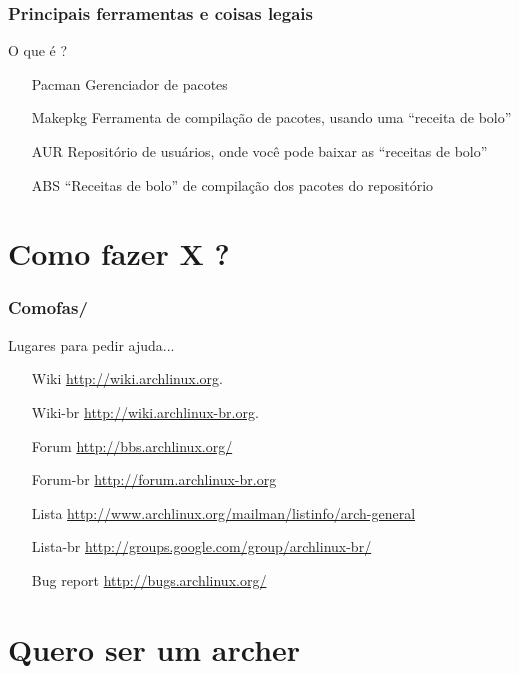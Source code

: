 \documentclass{beamer}
\begin{document}
\begin{frame}[fragile]
        \frametitle{Principais ferramentas e coisas legais}
        \begin{block}{O que é ?}
            \begin{itemize}
                \centering
                \item[Pacman] Gerenciador de pacotes
                \item[Makepkg] Ferramenta de compilação de pacotes, usando uma ``receita de bolo''
                \item[AUR] Repositório de usuários, onde você pode baixar as ``receitas de bolo''
                \item[ABS] ``Receitas de bolo'' de compilação dos pacotes do repositório
            \end{itemize}
        \end{block}
\end{frame}

\section{Como fazer X ? }

\begin{frame}
    \frametitle{Comofas/}
    \begin{block}{Lugares para pedir ajuda...}
        \begin{itemize}
            \centering
            \item[Wiki] \url{http://wiki.archlinux.org}. 
            \item[Wiki-br] \url{http://wiki.archlinux-br.org}. 
            \item[Forum] \url{http://bbs.archlinux.org/}  
            \item[Forum-br] \url{http://forum.archlinux-br.org}%
            \item[Lista] \url{http://www.archlinux.org/mailman/listinfo/arch-general}
            \item[Lista-br] \url{http://groups.google.com/group/archlinux-br/}
            \item[Bug report] \url{http://bugs.archlinux.org/} 
        \end{itemize}
    \end{block}        

\end{frame}


\section{Quero ser um archer }
    
\end{document}
